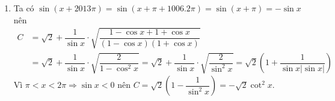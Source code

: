 \begin{vd}
{\begin{enumerate}
			\item Ta có $\sin (x+2013 \pi)=\sin (x+\pi+1006.2 \pi)=\sin (x+\pi)=-\sin x$ nên
			$$
			\begin{aligned}
				C&=\sqrt{2} +\dfrac{1}{\sin x} \cdot \sqrt{\dfrac{1-\cos x+1+\cos x}{(1-\cos x)(1+\cos x)}} \\
				& =\sqrt{2}+\dfrac{1}{\sin x} \cdot \sqrt{\dfrac{2}{1-\cos ^2 x}}=\sqrt{2}+\dfrac{1}{\sin x} \cdot \sqrt{\dfrac{2}{\sin ^2 x}}=\sqrt{2}\left(1+\dfrac{1}{\sin x|\sin x|}\right)
			\end{aligned}
			$$
			Vì $\pi<x<2 \pi \Rightarrow \sin x<0$ nên
			$C=\sqrt{2}\left(1-\dfrac{1}{\sin ^2 x}\right)=-\sqrt{2} \cot ^2 x.$
		\end{enumerate}
	}
\end{vd}

